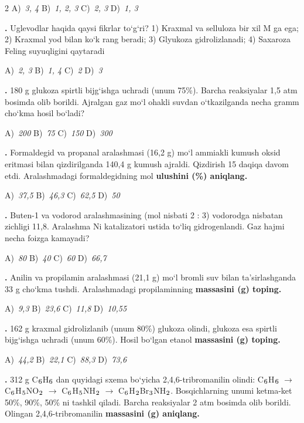 \documentclass[11pt,a4paper]{article}
\renewcommand{\textsubscript}[1]{\ensuremath{_{\text{\fontsize{8}{8}\selectfont #1}}}}
\newcommand{\qn}[1]{\textbf{\fontsize{11.5}{13}\selectfont #1}}
\newcommand{\qsep}{\par\vspace{13pt}}
\begin{document}
\begin{multicols}{2}
\noindent A)~\textsl{3, 4} \hfill B)~\textsl{1, 2, 3} \hfill C)~\textsl{2, 3} \hfill D)~\textsl{1, 3}\par
\qsep
\noindent\qn{22.} Uglevodlar haqida qaysi fikrlar to`g`ri? 1) Kraxmal va selluloza bir xil M ga ega; 2) Kraxmal yod bilan ko`k rang beradi; 3) Glyukoza gidrolizlanadi; 4) Saxaroza Feling suyuqligini qaytaradi

\noindent A)~\textsl{2, 3} \hfill B)~\textsl{1, 4} \hfill C)~\textsl{2} \hfill D)~\textsl{3}\par
\qsep
\noindent\qn{23.} 180 g glukoza spirtli bijg`ishga uchradi (unum 75\%). Barcha reaksiyalar 1,5 atm bosimda olib borildi. Ajralgan gaz mo`l ohakli suvdan o`tkazilganda necha gramm cho`kma hosil bo`ladi?

\noindent A)~\textsl{200} \hfill B)~\textsl{75} \hfill C)~\textsl{150} \hfill D)~\textsl{300}\par
\qsep
\noindent\qn{24.} Formaldegid va propanal aralashmasi (16,2 g) mo`l ammiakli kumush oksid eritmasi bilan qizdirilganda 140,4 g kumush ajraldi. Qizdirish 15 daqiqa davom etdi. Aralashmadagi formaldegidning mol \textbf{ulushini (\%) aniqlang.}

\noindent A)~\textsl{37,5} \hfill B)~\textsl{46,3} \hfill C)~\textsl{62,5} \hfill D)~\textsl{50}\par
\qsep
\noindent\qn{25.} Buten-1 va vodorod aralashmasining (mol nisbati 2 : 3) vodorodga nisbatan zichligi 11,8. Aralashma Ni katalizatori ustida to`liq gidrogenlandi. Gaz hajmi necha foizga kamayadi?

\noindent A)~\textsl{80} \hfill B)~\textsl{40} \hfill C)~\textsl{60} \hfill D)~\textsl{66,7}\par
\qsep
\noindent\qn{26.} Anilin va propilamin aralashmasi (21,1 g) mo`l bromli suv bilan ta'sirlashganda 33 g cho`kma tushdi. Aralashmadagi propilaminning \textbf{massasini (g) toping.}

\noindent A)~\textsl{9,3} \hfill B)~\textsl{23,6} \hfill C)~\textsl{11,8} \hfill D)~\textsl{10,55}\par
\qsep
\noindent\qn{27.} 162 g kraxmal gidrolizlanib (unum 80\%) glukoza olindi, glukoza esa spirtli bijg`ishga uchradi (unum 60\%). Hosil bo`lgan etanol \textbf{massasini (g) toping.}

\noindent A)~\textsl{44,2} \hfill B)~\textsl{22,1} \hfill C)~\textsl{88,3} \hfill D)~\textsl{73,6}\par
\qsep
\noindent\qn{28.} 312 g C\textsubscript{6}H\textsubscript{6} dan quyidagi sxema bo`yicha 2,4,6-tribromanilin olindi: C\textsubscript{6}H\textsubscript{6} $\to$ C\textsubscript{6}H\textsubscript{5}NO\textsubscript{2} $\to$ C\textsubscript{6}H\textsubscript{5}NH\textsubscript{2} $\to$ C\textsubscript{6}H\textsubscript{2}Br\textsubscript{3}NH\textsubscript{2}. Bosqichlarning unumi ketma-ket 50\%, 90\%, 50\% ni tashkil qiladi. Barcha reaksiyalar 2 atm bosimda olib borildi. Olingan 2,4,6-tribromanilin \textbf{massasini (g) aniqlang.}


\end{multicols}
\end{document}
